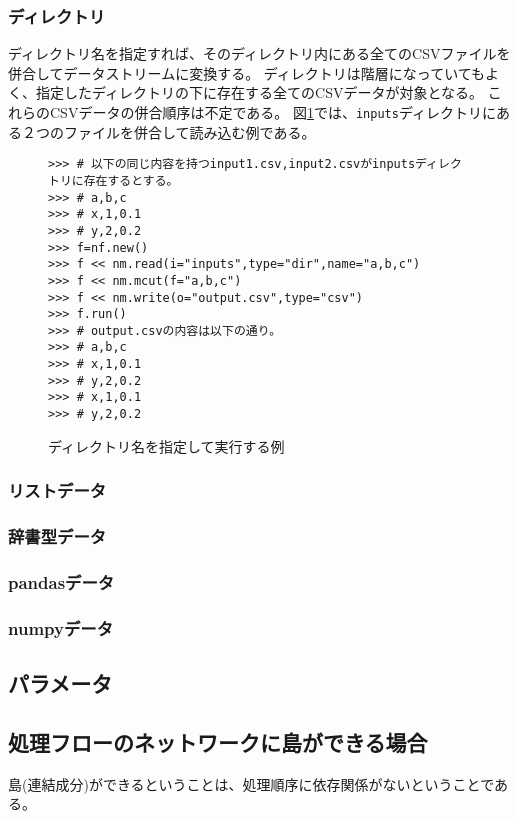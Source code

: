 \subsubsection*{ディレクトリ}
ディレクトリ名を指定すれば、そのディレクトリ内にある全てのCSVファイルを併合してデータストリームに変換する。
ディレクトリは階層になっていてもよく、指定したディレクトリの下に存在する全てのCSVデータが対象となる。
これらのCSVデータの併合順序は不定である。
図\ref{code:io_dir}では、\verb|inputs|ディレクトリにある２つのファイルを併合して読み込む例である。
\begin{figure}[htbp]
\begin{Verbatim}[baselinestretch=0.7,frame=single]
>>> # 以下の同じ内容を持つinput1.csv,input2.csvがinputsディレクトリに存在するとする。
>>> # a,b,c
>>> # x,1,0.1
>>> # y,2,0.2
>>> f=nf.new()
>>> f << nm.read(i="inputs",type="dir",name="a,b,c")
>>> f << nm.mcut(f="a,b,c")
>>> f << nm.write(o="output.csv",type="csv")
>>> f.run()
>>> # output.csvの内容は以下の通り。
>>> # a,b,c
>>> # x,1,0.1
>>> # y,2,0.2
>>> # x,1,0.1
>>> # y,2,0.2
\end{Verbatim}
\caption{ディレクトリ名を指定して実行する例\label{code:io_dir}}
\end{figure}

\subsubsection{リストデータ}
\subsubsection{辞書型データ}
\subsubsection{pandasデータ}
\subsubsection{numpyデータ}

\subsection{パラメータ}

\subsection{処理フローのネットワークに島ができる場合}
島(連結成分)ができるということは、処理順序に依存関係がないということである。

